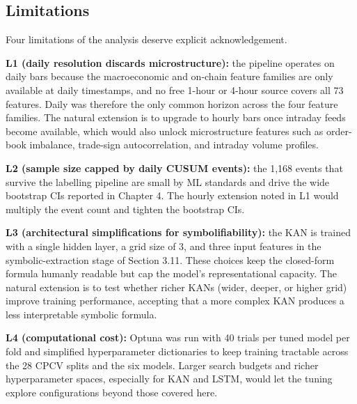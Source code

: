 \subsection{Limitations}\label{subsec:disc_limitations}

Four limitations of the analysis deserve explicit acknowledgement.

\textbf{L1 (daily resolution discards microstructure):} the pipeline operates on daily bars because the macroeconomic and on-chain feature families are only available at daily timestamps, and no free 1-hour or 4-hour source covers all 73 features. Daily was therefore the only common horizon across the four feature families. The natural extension is to upgrade to hourly bars once intraday feeds become available, which would also unlock microstructure features such as order-book imbalance, trade-sign autocorrelation, and intraday volume profiles.

\textbf{L2 (sample size capped by daily CUSUM events):} the 1,168 events that survive the labelling pipeline are small by ML standards and drive the wide bootstrap CIs reported in Chapter 4. The hourly extension noted in L1 would multiply the event count and tighten the bootstrap CIs.

\textbf{L3 (architectural simplifications for symbolifiability):} the KAN is trained with a single hidden layer, a grid size of 3, and three input features in the symbolic-extraction stage of Section 3.11. These choices keep the closed-form formula humanly readable but cap the model's representational capacity. The natural extension is to test whether richer KANs (wider, deeper, or higher grid) improve training performance, accepting that a more complex KAN produces a less interpretable symbolic formula.

\textbf{L4 (computational cost):} Optuna was run with 40 trials per tuned model per fold and simplified hyperparameter dictionaries to keep training tractable across the 28 CPCV splits and the six models. Larger search budgets and richer hyperparameter spaces, especially for KAN and LSTM, would let the tuning explore configurations beyond those covered here.